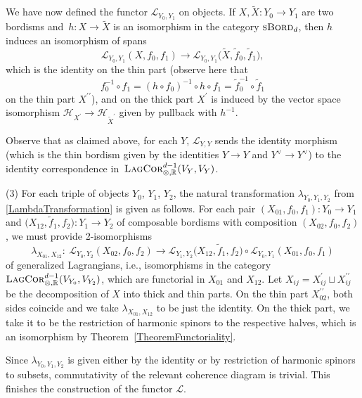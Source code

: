 \documentclass[pdftex]{sigma}
\numberwithin{equation}{section}
\newcommand{\LagCor}{\textsc{LagCor}}
\newcommand{\R}{\mathbb{R}}
\newcommand{\sBord}{\textsc{sBord}}
\begin{document}
We have now defined the functor $\mathcal{L}_{Y_0, Y_1}$ on objects.
If $X, \tilde{X}\colon Y_0 \to Y_1$ are two bordisms and~${h\colon X \to \tilde{X}}$ is an isomorphism in the category $\sBord_d$, then $h$ induces an isomorphism of spans
\[
\mathcal{L}_{Y_0, Y_1}(X, f_0, f_1) \longrightarrow \mathcal{L}_{Y_0, Y_1}\big(\tilde{X}, \tilde{f}_0, \tilde{f}_1\big),
\]
 which is the identity on the thin part (observe here that
\begin{equation*}
f_0^{-1} \circ f_1 = (h \circ f_0)^{-1} \circ h \circ f_1 = \tilde{f}_0^{-1} \circ \tilde{f}_1
\end{equation*}
on the thin part $X^{\prime\prime}$), and on the thick part $X^{\prime}$ is induced by the vector space isomorphism $\mathcal{H}_{{X}^{\prime}} \to \mathcal{H}_{\tilde{X}^\prime}$ given by pullback with $h^{-1}$.

Observe that as claimed above, for each $Y$, $\mathcal{L}_{Y, Y}$ sends the identity morphism (which is the thin bordism given by the identities $Y \to Y$ and $Y^\vee \to Y^\vee$) to the identity correspondence in~$\LagCor_{\otimes, \R}^{d-1}(V_Y, V_Y)$.

(3)
For each triple of objects $Y_0$, $Y_1$, $Y_2$, the natural transformation $\lambda_{Y_0, Y_1, Y_2}$ from \eqref{LambdaTransformation} is given as follows.
For each pair $(X_{01}, f_0, f_1)\colon Y_0 \to Y_1$ and $\big(X_{12}, \tilde{f}_1, f_2\big) \colon Y_1 \to Y_2$ of composable bordisms with composition $(X_{02}, f_0, f_2)$, we must provide 2-isomorphisms
\begin{equation*}
\lambda_{X_{01}, X_{12}} \colon\ \mathcal{L}_{Y_0, Y_2}(X_{02}, f_0, f_2) \longrightarrow \mathcal{L}_{Y_1, Y_2}\big(X_{12}, \tilde{f}_1, f_2\big) \circ \mathcal{L}_{Y_0, Y_1}(X_{01}, f_0, f_1)
\end{equation*}
of generalized Lagrangians, i.e., isomorphisms in the category $\LagCor_{\otimes, \R}^{d-1}(V_{Y_0}, V_{Y_2})$, which are functorial in $X_{01}$ and $X_{12}$.
Let $X_{ij} = X^\prime_{ij} \sqcup X^{\prime\prime}_{ij}$ be the decomposition of $X$ into thick and thin parts.
On the thin part $X_{02}^{\prime\prime}$, both sides coincide and we take $\lambda_{X_{01}, X_{12}}$ to be just the identity.
On the thick part, we take it to be the restriction of harmonic spinors to the respective halves, which is an isomorphism by Theorem~\ref{TheoremFunctoriality}.

Since $\lambda_{Y_0, Y_1, Y_2}$ is given either by the identity or by restriction of harmonic spinors to subsets, commutativity of the relevant coherence diagram is trivial.
This finishes the construction of the functor $\mathcal{L}$.
\end{document}
